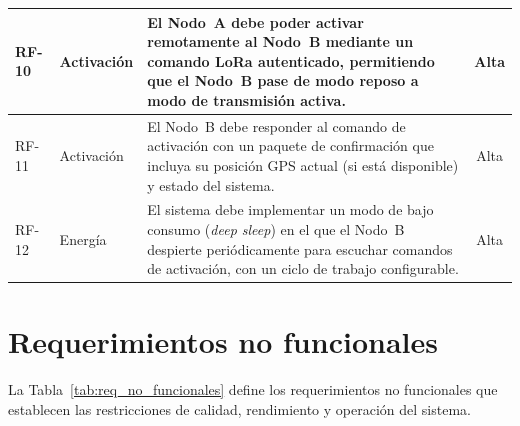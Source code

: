 \begin{table}[H]
\begin{center}
{\begin{tabular}{| l | l | p{9.5cm} | c |}
\hline
RF-10 & Activación & El Nodo~A debe poder activar remotamente al Nodo~B mediante un comando LoRa autenticado, permitiendo que el Nodo~B pase de modo reposo a modo de transmisión activa. & Alta \\
\hline
RF-11 & Activación & El Nodo~B debe responder al comando de activación con un paquete de confirmación que incluya su posición GPS actual (si está disponible) y estado del sistema. & Alta \\
\hline
RF-12 & Energía & El sistema debe implementar un modo de bajo consumo (\textit{deep sleep}) en el que el Nodo~B despierte periódicamente para escuchar comandos de activación, con un ciclo de trabajo configurable. & Alta \\
\hline

\end{tabular}}
\label{tab:req_funcionales}
\end{center}
\end{table}


\section{Requerimientos no funcionales}\label{sec:req_no_funcionales}

La Tabla~\ref{tab:req_no_funcionales} define los requerimientos no funcionales que establecen las restricciones de calidad, rendimiento y operación del sistema.

